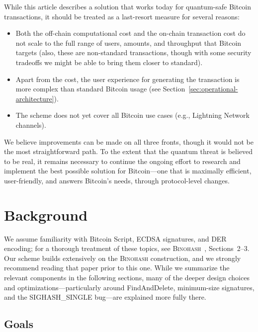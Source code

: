 \documentclass[11pt, a4paper]{article}
\begin{document}
While this article describes a solution that works today for quantum-safe Bitcoin transactions, it should be treated as a last-resort measure for several reasons:
\begin{itemize}\setlength{\itemsep}{1pt}\setlength{\parskip}{0pt}
    \item Both the off-chain computational cost and the on-chain transaction cost do not scale to the full range of users, amounts, and throughput that Bitcoin targets (also, these are non-standard transactions, though with some security tradeoffs we might be able to bring them closer to standard).
    \item Apart from the cost, the user experience for generating the transaction is more complex than standard Bitcoin usage (see Section~\ref{sec:operational-architecture}).
    \item The scheme does not yet cover all Bitcoin use cases (e.g., Lightning Network channels).
\end{itemize}
\noindent We believe improvements can be made on all three fronts, though it would not be the most straightforward path. To the extent that the quantum threat is believed to be real, it remains necessary to continue the ongoing effort to research and implement the best possible solution for Bitcoin---one that is maximally efficient, user-friendly, and answers Bitcoin's needs, through protocol-level changes.

\section{Background}
\label{sec:background}

We assume familiarity with Bitcoin Script, ECDSA signatures, and DER encoding; for a thorough treatment of these topics, see \textsc{Binohash}~\cite{linus2024binohash}, Sections~2--3. Our scheme builds extensively on the \textsc{Binohash} construction, and we strongly recommend reading that paper prior to this one. While we summarize the relevant components in the following sections, many of the deeper design choices and optimizations---particularly around FindAndDelete, minimum-size signatures, and the SIGHASH\_SINGLE bug---are explained more fully there.

\subsection{Goals}
\label{sec:goals}
\end{document}
